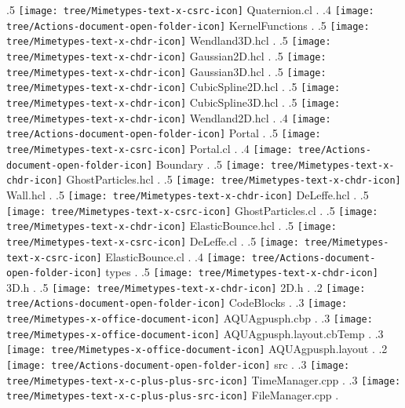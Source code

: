 {.5 { \texttt{[image: tree/Mimetypes-text-x-csrc-icon]} Quaternion.cl }.
.4 { \texttt{[image: tree/Actions-document-open-folder-icon]} KernelFunctions }.
.5 { \texttt{[image: tree/Mimetypes-text-x-chdr-icon]} Wendland3D.hcl }.
.5 { \texttt{[image: tree/Mimetypes-text-x-chdr-icon]} Gaussian2D.hcl }.
.5 { \texttt{[image: tree/Mimetypes-text-x-chdr-icon]} Gaussian3D.hcl }.
.5 { \texttt{[image: tree/Mimetypes-text-x-chdr-icon]} CubicSpline2D.hcl }.
.5 { \texttt{[image: tree/Mimetypes-text-x-chdr-icon]} CubicSpline3D.hcl }.
.5 { \texttt{[image: tree/Mimetypes-text-x-chdr-icon]} Wendland2D.hcl }.
.4 { \texttt{[image: tree/Actions-document-open-folder-icon]} Portal }.
.5 { \texttt{[image: tree/Mimetypes-text-x-csrc-icon]} Portal.cl }.
.4 { \texttt{[image: tree/Actions-document-open-folder-icon]} Boundary }.
.5 { \texttt{[image: tree/Mimetypes-text-x-chdr-icon]} GhostParticles.hcl }.
.5 { \texttt{[image: tree/Mimetypes-text-x-chdr-icon]} Wall.hcl }.
.5 { \texttt{[image: tree/Mimetypes-text-x-chdr-icon]} DeLeffe.hcl }.
.5 { \texttt{[image: tree/Mimetypes-text-x-csrc-icon]} GhostParticles.cl }.
.5 { \texttt{[image: tree/Mimetypes-text-x-chdr-icon]} ElasticBounce.hcl }.
.5 { \texttt{[image: tree/Mimetypes-text-x-csrc-icon]} DeLeffe.cl }.
.5 { \texttt{[image: tree/Mimetypes-text-x-csrc-icon]} ElasticBounce.cl }.
.4 { \texttt{[image: tree/Actions-document-open-folder-icon]} types }.
.5 { \texttt{[image: tree/Mimetypes-text-x-chdr-icon]} 3D.h }.
.5 { \texttt{[image: tree/Mimetypes-text-x-chdr-icon]} 2D.h }.
.2 { \texttt{[image: tree/Actions-document-open-folder-icon]} CodeBlocks }.
.3 { \texttt{[image: tree/Mimetypes-x-office-document-icon]} AQUAgpusph.cbp }.
.3 { \texttt{[image: tree/Mimetypes-x-office-document-icon]} AQUAgpusph.layout.cbTemp }.
.3 { \texttt{[image: tree/Mimetypes-x-office-document-icon]} AQUAgpusph.layout }.
.2 { \texttt{[image: tree/Actions-document-open-folder-icon]} src }.
.3 { \texttt{[image: tree/Mimetypes-text-x-c-plus-plus-src-icon]} TimeManager.cpp }.
.3 { \texttt{[image: tree/Mimetypes-text-x-c-plus-plus-src-icon]} FileManager.cpp }.
}
